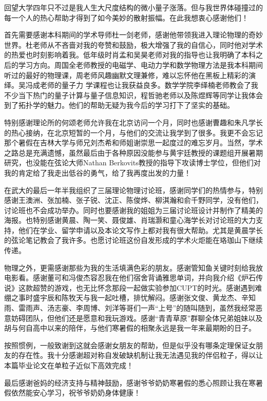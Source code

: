 \begin{acknowledgements}
	回望大学四年只不过是我人生大尺度结构的微小量子涨落。但与我世界体碰撞过的每一个人的热心帮助才得到了如今美妙的散射振幅。在此我想衷心感谢他们！
	
	首先需要感谢本科期间的学术导师杜一剑老师，感谢他带领我进入理论物理的奇妙世界。杜老师从不吝啬对我的夸赞和鼓励，极大增强了我的自信心，同时他对学术的热爱也时刻影响着我。低年级时肖孟和吴昊老师对我的指导也让我明确了本科之后的学习方向。周国全老师教授的电磁学、电动力学和数学物理方法是我本科期间听过的最好的物理课，周老师风趣幽默文理兼修，难以忘怀他在黑板上精彩的演绎。吴冯成老师的量子力 学课程也让我获益良多。数学学院李绎楠老师教会了我不少当下热门的量子计算与量子信息知识，程哲驰老师以及陈煜辉等同学让我体会到了拓扑学的魅力。他们的帮助无疑为我今后的学习打下了坚实的基础。
	
	特别感谢理论所的何颂老师允许我在北京访问一个月，同时也感谢曹趣和朱凡学长的热心接纳，在北京短暂的一个月，与他们的交流让我学到了很多。我更不会忘记那个暑假在吉林大学与师兄刘杰希和师姐谢崇思一起度过的难忘岁月。当然，学术之路总是充满遗憾，虽然最后由于各种原因没能参与黄宇廷教授的课题组开展暑期研究，也没能在弦论大师Nathan Berkovits教授的指导下攻读博士学位，但他们对我的肯定给了我走出低谷的勇气，给了我再度出发的力量！
	
	在武大的最后一年半我组织了三届理论物理讨论班，感谢同学们的热情参与，特别感谢王澳洲、张加楠、张子锐、沈正、陈俊烨、柳淇瀚和俞千野同学，没有他们，讨论班也不会成功举办。同时也要感谢我的姐姐为三届讨论班设计并制作了精美的海报。也特别感谢黄晨、陶一笑、聂俊雄、肖瑞灏和童心海学长对讨论班的大力支持，他们在学业、留学申请以及本论文写作上都对我有很大帮助。尤其是黄晨学长的弦论笔记教会了我许多。也愿讨论班这份自发形成的学术火炬能在珞珈山下继续传递。
	
	物理之外，更需感谢那些为我的生活填满色彩的朋友。感谢管知鱼关键时刻给我放电影看。感谢董可和冯俊杰容忍我在他们宿舍背诵雅思单词，并向我介绍《炉石传说》这款超赞的游戏，也无比怀念那段一起做实验参加CUPT的时光。感谢遇到难绷之事时盛宇辰和陈牧天与我一起吐槽，排忧解闷。感谢张文俊、黄龙杰、辛知雨、雷雨声、汤志豪、李周博、刘洋等哥们一声“上号”的随叫随到，虽然我经常恶意妨碍团队，但他们还是愿意和我玩游戏。感谢“青青草原”群聊全体兄弟姐妹以及胡与何自高中以来的陪伴，与他们寒暑假的相聚永远是我一年来最期盼的日子。
	
	按照惯例，一般致谢到这就会感谢女朋友的帮助，但是似乎没有哪条定理保证女朋友的存在性。我十分感谢超对称自发破缺机制让我无法遇见我的伴侣粒子，得以让本篇毕业论文在单粒子近似下高效完成！
	
	最后感谢爸妈的经济支持与精神鼓励，感谢爷爷奶奶寒暑假的悉心照顾让我在寒暑假依然能安心学习，祝爷爷奶奶身体健康！
\end{acknowledgements}
